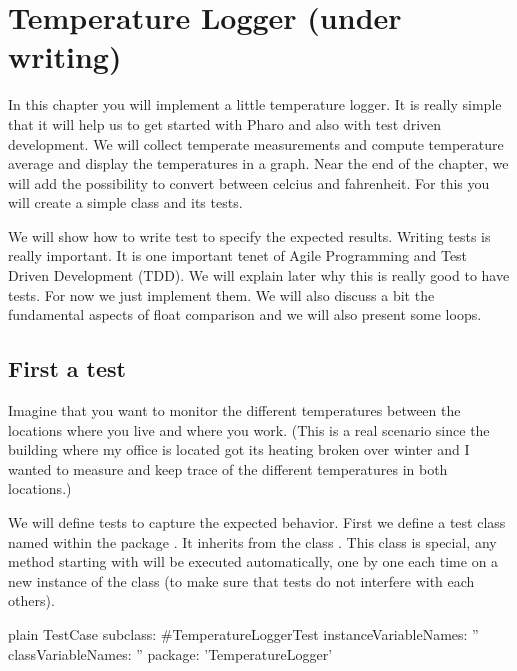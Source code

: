 \documentclass[10pt,twoside,english]{_support/latex/sbabook/sbabook}
\begin{document}
\frontmatter
\pagestyle{plain}

\tableofcontents*
\clearpage\listoffigures

\mainmatter

\chapter{Temperature Logger (under writing)}\label{cha_converter}
In this chapter you will implement a little temperature logger. It is really simple that it will help us to get started with Pharo and also with test driven development.
We will collect temperate measurements and compute temperature average and display the temperatures in a graph.
Near the end of the chapter, we will add the possibility to convert between celcius and fahrenheit. For this you will create a simple class and its tests.

We will show how to write test to specify the expected results. Writing tests is really important. It is one important tenet of Agile Programming and Test Driven Development (TDD). We will explain later why this is really good to have tests. For now we just implement them. We will also discuss a bit the fundamental aspects of float comparison and we will also present some loops.
\section{First a test}
Imagine  that you want to monitor the different temperatures between the locations where you live and where you work. (This is a real scenario since the building where my office is located got its heating broken over winter and I wanted to measure and keep trace of the different temperatures in both locations.)

We will define tests to capture the expected behavior. First we define a test class named  within the package . It inherits from the class . This class is special, any method starting with  will be executed automatically, one by one each time on a new instance of the class (to make sure that tests do not interfere with each others).

\begin{displaycode}{plain}
TestCase subclass: #TemperatureLoggerTest
    instanceVariableNames: ''
    classVariableNames: ''
    package: 'TemperatureLogger'
\end{displaycode}
\end{document}
